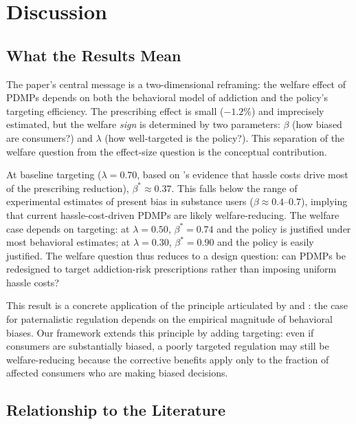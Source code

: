\documentclass[12pt]{article}
\begin{document}
\section{Discussion}\label{sec:discussion}

\subsection{What the Results Mean}\label{sec:discussion_meaning}

The paper's central message is a two-dimensional reframing: the welfare effect of PDMPs depends on both the behavioral model of addiction and the policy's targeting efficiency. The prescribing effect is small ($-1.2\%$) and imprecisely estimated, but the welfare \textit{sign} is determined by two parameters: $\beta$ (how biased are consumers?) and $\lambda$ (how well-targeted is the policy?). This separation of the welfare question from the effect-size question is the conceptual contribution.

At baseline targeting ($\lambda = 0.70$, based on \citet{buchmueller2018effect}'s evidence that hassle costs drive most of the prescribing reduction), $\beta^* \approx 0.37$. This falls below the range of experimental estimates of present bias in substance users ($\beta \approx 0.4$--$0.7$), implying that current hassle-cost-driven PDMPs are likely welfare-reducing. The welfare case depends on targeting: at $\lambda = 0.50$, $\beta^* = 0.74$ and the policy is justified under most behavioral estimates; at $\lambda = 0.30$, $\beta^* = 0.90$ and the policy is easily justified. The welfare question thus reduces to a design question: can PDMPs be redesigned to target addiction-risk prescriptions rather than imposing uniform hassle costs?

This result is a concrete application of the principle articulated by \citet{bernheim2009behavioral} and \citet{thaler2003libertarian}: the case for paternalistic regulation depends on the empirical magnitude of behavioral biases. Our framework extends this principle by adding targeting: even if consumers are substantially biased, a poorly targeted regulation may still be welfare-reducing because the corrective benefits apply only to the fraction of affected consumers who are making biased decisions.

\subsection{Relationship to the Literature}\label{sec:discussion_literature}
\end{document}
